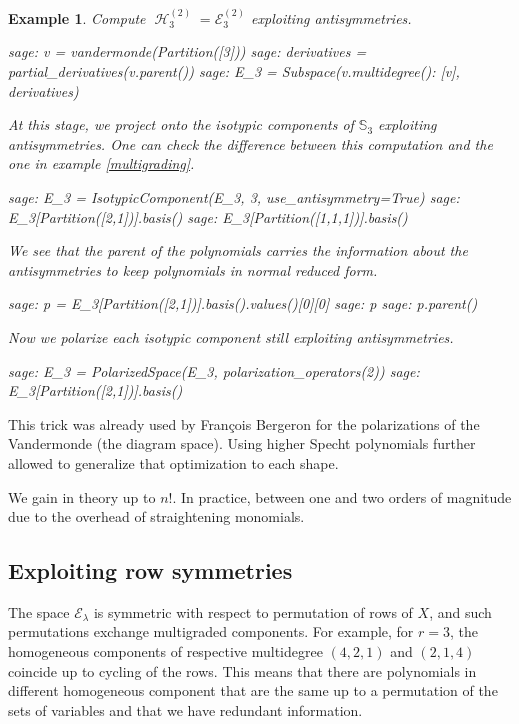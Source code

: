 \documentclass[letter,12pt]{article}
\newcommand{\Sym}[1]{\mathbb{S}_{#1}}
\DeclareMathOperator{\harmonics}{\mathcal{H}}
\newtheorem{example}{Example}
\begin{document}
	\begin{example}
			Compute $\harmonics_3^{(2)} = \mathcal{E}_3^{(2)}$ exploiting antisymmetries. 
		\begin{sagecommandline}
			sage: v = vandermonde(Partition([3]))
			sage: derivatives = partial_derivatives(v.parent())
			sage: E_3 = Subspace({v.multidegree(): [v]}, derivatives)
		\end{sagecommandline}
		At this stage, we project onto the isotypic components of $\Sym{3}$ exploiting antisymmetries. One can check the difference between this computation and the one in example \ref{multigrading}. 
		\begin{sagecommandline}
			sage: E_3 = IsotypicComponent(E_3, 3, use_antisymmetry=True)
			sage: E_3[Partition([2,1])].basis()
			sage: E_3[Partition([1,1,1])].basis()
		\end{sagecommandline}
		We see that the parent of the polynomials carries the information about the antisymmetries to keep polynomials in normal reduced form.
		\begin{sagecommandline}
			sage: p = E_3[Partition([2,1])].basis().values()[0][0]
			sage: p
			sage: p.parent()
		\end{sagecommandline}
		Now we polarize each isotypic component still exploiting antisymmetries.  
		\begin{sagecommandline}
			sage: E_3 = PolarizedSpace(E_3, polarization_operators(2))
			sage: E_3[Partition([2,1])].basis()
		\end{sagecommandline}
	\end{example}
	
	This trick was already used by François Bergeron for the polarizations of the Vandermonde (the diagram space). Using higher Specht polynomials further allowed  to generalize that optimization to each shape.
	
	We gain in theory up to $n!$. In practice, between one and two orders of magnitude due to the overhead of straightening monomials.
	
	\subsection{Exploiting row symmetries}
	
	The space $\mathcal{E}_\lambda$ is symmetric with respect to permutation of rows of $X$, and such permutations exchange multigraded components. For example, for $r=3$, the homogeneous components of respective multidegree $(4,2,1)$ and $(2,1,4)$ coincide up to cycling of the rows. This means that there are polynomials in different homogeneous component that are the same up to a permutation of the sets of variables and that we have redundant information. 
	
\end{document}
